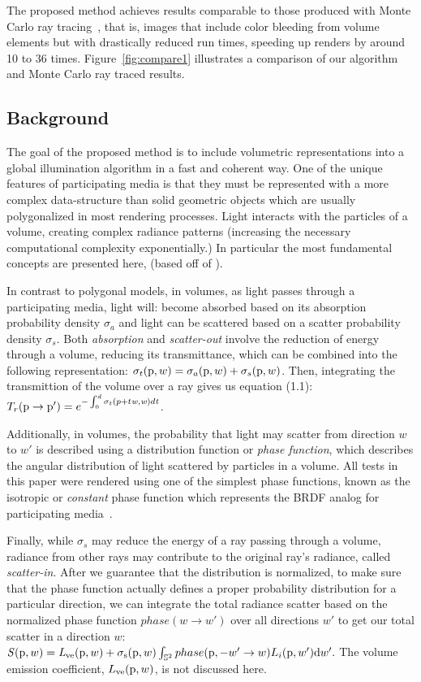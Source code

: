 \documentclass[runningheads]{llncs}
\begin{document}
  The proposed method achieves results comparable to those produced with Monte Carlo ray tracing~\cite{MCRay1}, that is, images that include color bleeding from volume elements but with drastically reduced run times, speeding up renders by around 10 to 36 times.  Figure~\ref{fig:compare1} illustrates a comparison of our algorithm and Monte Carlo ray traced results.


\subsection{Background}
\label{background_sec}
The goal of the proposed method is to include volumetric representations into a global illumination algorithm in a fast and coherent way. One of the unique features of participating media is that they must be represented with a more complex data-structure than solid geometric objects which are usually polygonalized in most rendering processes.  Light interacts with the particles of a volume, creating complex radiance patterns (increasing the necessary computational complexity exponentially.) In particular the most fundamental concepts are presented here,  (based off of  \cite{pbrt}).

In contrast to polygonal models, in volumes, as light passes through a participating media, light will: become absorbed based on its absorption probability density $\sigma_{a}$ and light can be scattered based on a scatter probability density $\sigma_{s}$.  Both \emph{absorption} and \emph{scatter-out} involve the reduction of energy through a volume, reducing its transmittance, which can be combined into the following representation: $\sigma_{t}(\textup{p},w) = \sigma_{a}(\textup{p},w) + \sigma_{s}(\textup{p}, w)$.
Then, integrating the transmittion of the volume over a ray gives us equation (1.1): $T_{r}(\textup{p} \to \textup{p}') = e^{-\int_{0}^{d}\sigma_{t} (p+t\mathit{w},\mathit{w})d\mathit{t}}\label{transmittion_eq}$.

Additionally, in volumes, the probability that light may scatter from direction $w$ to $w'$ is described using a distribution function or \textit{phase function}, which describes the angular distribution of light scattered by particles in a volume.  All tests in this paper were rendered using one of the simplest phase functions, known as the isotropic or \textit{constant} phase function which represents the BRDF analog for participating media~\cite{cerezo}.

Finally, while $\sigma_{s}$ may reduce the energy of a ray passing through a volume, radiance from other rays may contribute to the original ray's radiance, called \emph{scatter-in}.  After we guarantee that the distribution is normalized,  to make sure that the phase function actually defines a proper probability distribution for a particular direction, we can integrate the total radiance scatter based on the normalized phase function $phase(w \to w')$ over all directions $w'$ to get our total scatter in a direction $w$: $\mathit{S}(\textup{p},w) = \mathit{L}_{\textup{ve}}(\textup{p},w) + \sigma_{\textup{s}}(\textup{p}, w) \int_{\mathbb{S}^2} phase(\textup{p}, -w' \to w) L_{i}(\textup{p},w')\textup{d}w'.$  The volume emission coefficient, $L_{\textup{ve}}(\textup{p}, w)$, is not discussed here.
\end{document}

